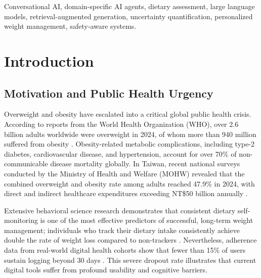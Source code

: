 \documentclass[conference]{IEEEtran}
\begin{document}
\begin{IEEEkeywords}
Conversational AI, domain-specific AI agents, dietary assessment, large language models, retrieval-augmented generation, uncertainty quantification, personalized weight management, safety-aware systems.
\end{IEEEkeywords}

\section{Introduction}

\subsection{Motivation and Public Health Urgency}
Overweight and obesity have escalated into a critical global public health crisis. According to reports from the World Health Organization (WHO), over 2.6 billion adults worldwide were overweight in 2024, of whom more than 940 million suffered from obesity \cite{who2024obesity}. Obesity-related metabolic complications, including type-2 diabetes, cardiovascular disease, and hypertension, account for over 70\% of non-communicable disease mortality globally. In Taiwan, recent national surveys conducted by the Ministry of Health and Welfare (MOHW) revealed that the combined overweight and obesity rate among adults reached 47.9\% in 2024, with direct and indirect healthcare expenditures exceeding NT\$50 billion annually \cite{mohw2024survey}. 

Extensive behavioral science research demonstrates that consistent dietary self-monitoring is one of the most effective predictors of successful, long-term weight management; individuals who track their dietary intake consistently achieve double the rate of weight loss compared to non-trackers \cite{teixeira2025self, vanhorn2024dietary}. Nevertheless, adherence data from real-world digital health cohorts show that fewer than 15\% of users sustain logging beyond 30 days \cite{helander2014breaks}. This severe dropout rate illustrates that current digital tools suffer from profound usability and cognitive barriers.
\end{document}
